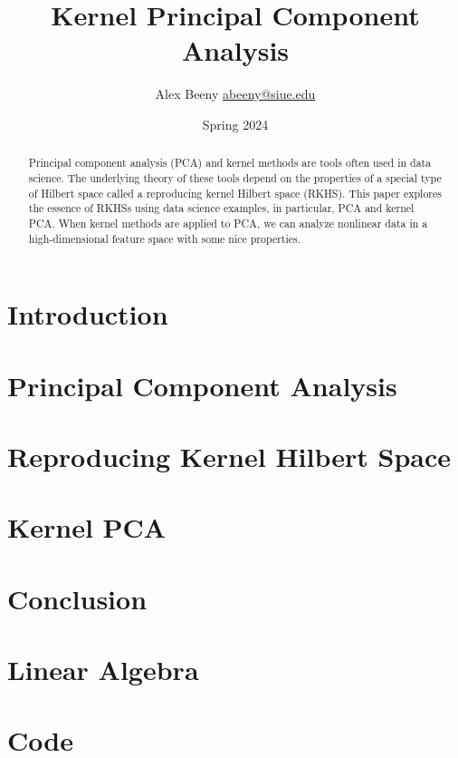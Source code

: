 \documentclass{article}
\title{Kernel Principal Component Analysis}
\author{Alex Beeny \url{abeeny@siue.edu}}
\date{Spring 2024}
\theoremstyle{definition}
\begin{document}
\maketitle
\tableofcontents
\begin{abstract}
    Principal component analysis (PCA) and kernel methods are tools often used in data science.
    The underlying theory of these tools depend on the properties of a special type of Hilbert space called a reproducing kernel Hilbert space (RKHS).
    This paper explores the essence of RKHSs using data science examples, in particular, PCA and kernel PCA.
    When kernel methods are applied to PCA, we can analyze nonlinear data in a high-dimensional feature space with some nice properties.
\end{abstract}
\section{Introduction}
\label{sec:introduction}

\section{Principal Component Analysis}
\label{sec:principal-component-analysis}

\section{Reproducing Kernel Hilbert Space}
\label{sec:reproducing-kernel-hilbert-space}

\section{Kernel PCA}
\label{sec:kernel-pca}

\section{Conclusion}
\label{sec:conclusion}

\appendix
\section{Linear Algebra}
\label{sec:linear-algebra}

% 
% 
\section{Code}
\label{sec:code}




\end{document}
